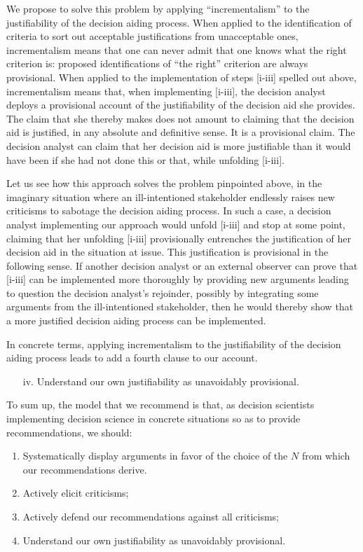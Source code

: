\documentclass[preprint, french, english, 11pt, authoryear]{elsarticle}%
\begin{document}
We propose to solve this problem by applying ``incrementalism'' to the justifiability of the decision aiding process. When applied to the identification of criteria to sort out acceptable justifications from unacceptable ones, incrementalism means that one can never admit that one knows what the right criterion is: proposed identifications of ``the right'' criterion are always provisional. When applied to the implementation of steps [i-iii] spelled out above, incrementalism means that, when implementing [i-iii], the decision analyst deploys a provisional account of the justifiability of the decision aid she provides. The claim that she thereby makes does not amount to claiming that the decision aid is justified, in any absolute and definitive sense. It is a provisional claim. The decision analyst can claim that her decision aid is more justifiable than it would have been if she had not done this or that, while unfolding [i-iii].

Let us see how this approach solves the problem pinpointed above, in the imaginary situation where an ill-intentioned stakeholder endlessly raises new criticisms to sabotage the decision aiding process. In such a case, a decision analyst implementing our approach would unfold [i-iii] and stop at some point, claiming that her unfolding [i-iii] provisionally entrenches the justification of her decision aid in the situation at issue. This justification is provisional in the following sense. If another decision analyst or an external observer can prove that [i-iii] can be implemented more thoroughly by providing new arguments leading to question the decision analyst's rejoinder, possibly by integrating some arguments from the ill-intentioned stakeholder, then he would thereby show that a more justified decision aiding process can be implemented.

In concrete terms, applying incrementalism to the justifiability of the decision aiding process leads to add a fourth clause to our account.
\begin{itemize}
\item[iv.]	Understand our own justifiability as unavoidably provisional.
\end{itemize}

To sum up, the model that we recommend is that, as decision scientists implementing decision science in concrete situations so as to provide recommendations, we should:
\begin{enumerate}[label=\roman*.]
	\item Systematically display arguments in favor of the choice of the $N$ from which our recommendations derive.
	\item Actively elicit criticisms;
	\item Actively defend our recommendations against all criticisms;
	\item Understand our own justifiability as unavoidably provisional.
\end{enumerate}
\end{document}
